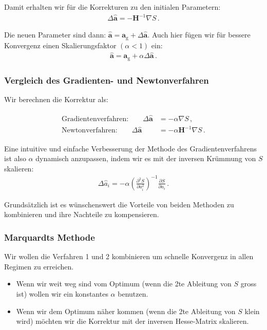 Damit erhalten wir f\"ur die Korrekturen zu den initialen Parametern:
\begin{align}
\Delta \boldsymbol{\hat{a}} = -\boldsymbol{H}^{-1} \nabla S\,.
\label{eq:vl9-12}
\end{align}

Die neuen Parameter sind dann: $\boldsymbol{\hat{a}} = \boldsymbol{a}_\mathrm{g} + \Delta \boldsymbol{\hat{a}}$. Auch hier f\"ugen wir f\"ur bessere Konvergenz einen Skalierungsfaktor $(\alpha < 1)$ ein:
\begin{align}
\boldsymbol{\hat{a}} = \boldsymbol{a}_\mathrm{g} + \alpha \Delta \boldsymbol{\hat{a}}\,.
\label{eq:vl9-13}
\end{align}


\subsubsection{Vergleich des Gradienten- und Newtonverfahren}
\label{subsubsec:vl9-3}

Wir berechnen die Korrektur als:

\begin{align}
\begin{split}
\text{Gradientenverfahren:}\quad \quad \Delta \boldsymbol{\hat{a}} &= -\alpha \nabla S\,,\\
\text{Newtonverfahren:}\quad \quad \Delta \boldsymbol{\hat{a}} &= -\alpha \boldsymbol{H}^{-1} \nabla S\,.
\label{eq:vl9-14}
\end{split}
\end{align}

Eine intuitive und einfache Verbesserung der Methode des Gradientenverfahrens ist also $\alpha$ dynamisch anzupassen, indem wir es mit der inversen Kr\"ummung von $S$ skalieren:
\begin{align}
\Delta \hat{a}_i = -\alpha \left( \frac{ \partial^2 S }{ \partial a_i^2 } \right)^{-1} \frac{ \partial S }{ \partial a_i }\,.
\label{eq:vl9-15}
\end{align}

Grunds\"atzlich ist es w\"unschenswert die Vorteile von beiden Methoden zu kombinieren und ihre Nachteile zu kompensieren.


\subsubsection{Marquardts Methode}
\label{subsubsec:vl9-4}

Wir wollen die Verfahren 1 und 2 kombinieren um schnelle Konvergenz in allen Regimen zu erreichen.
\begin{itemize}
    \setlength\itemsep{0em}
        \item Wenn wir weit weg sind vom Optimum (wenn die 2te Ableitung von $S$ gross ist) wollen wir ein konstantes $\alpha$ benutzen.
        \item Wenn wir dem Optimum n\"aher kommen (wenn die 2te Ableitung von $S$ klein wird) m\"ochten wir die Korrektur mit der inversen Hesse-Matrix skalieren.
\end{itemize}

